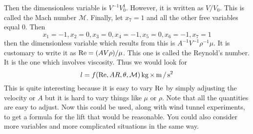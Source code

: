 Then the dimensionless variable is $V^{-1}V_{0}^{1}$. However, it is written
as $V/V_{0}$. This is called the Mach number $\mathcal{M}$. Finally, let
$x_{7}=1$ and all the other free variables equal 0. Then
\begin{equation*}
x_{1}=-1,x_{2}=0,x_{3}=0,x_{4}=-1,x_{5}=0,x_{6}=-1,x_{7}=1
\end{equation*}
then the dimensionless variable which results from this is $A^{-1}V^{-1}\rho
^{-1}\mu$. It is customary to write it as $\mbox{\rm Re}=(AV\rho)
/\mu$. This one is called the Reynold's number. It is the one which
involves viscosity. Thus we would look for
\begin{equation*}
l=f(\mbox{\rm Re},AR,\theta ,\mathcal{M}) \mathop{\textrm{\rm kg}}\nolimits\times \mathop{\textrm{\rm m}}\nolimits/\mathop{\textrm{\rm s}}\nolimits ^{2}
\end{equation*}
This is quite interesting because it is easy to vary $\mbox{\rm Re}$ by simply
adjusting the velocity or $A$ but it is hard to vary things like $\mu $ or $%
\rho$. Note that all the quantities are easy to adjust. Now this could be
used, along with wind tunnel experiments, to get a formula for the lift that
would be reasonable. You could also consider more variables and more
complicated situations in the same way.

